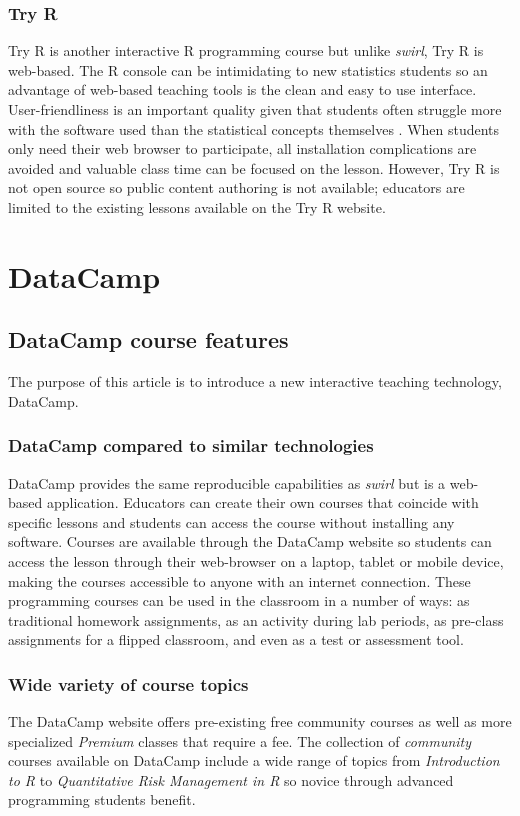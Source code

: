 \documentclass[12pt]{article}\usepackage[]{graphicx}\usepackage[]{color}
\begin{document}
\subsubsection{Try R}
Try R \citep{TryR} is another interactive R programming course but unlike \textit{swirl}, Try R is web-based. 
The R console can be intimidating to
new statistics students so an advantage of web-based teaching tools is
the clean and easy to use interface. User-friendliness is an important quality given that students often struggle more with the
software used than the statistical concepts themselves \citep{Hare2017}. When students only need their web browser to participate,
all installation complications are avoided and valuable class time can be focused on the lesson.
However, Try R is not open source so public content authoring
is not available; educators are limited to the existing lessons available on the Try R website. 

\section{DataCamp}


\subsection{DataCamp course features}

The purpose of this article is to introduce a new interactive teaching technology, DataCamp.

\subsubsection{DataCamp compared to similar technologies}
DataCamp provides the same reproducible capabilities as \textit{swirl} but is a web-based application. Educators can
create their own courses that coincide with specific lessons and students can access the course without installing any software.
Courses are available through the DataCamp website so students can access the lesson through their web-browser on a laptop,
tablet or mobile device, making the courses accessible to anyone with an internet connection. These programming courses can be used in the 
classroom in a number of ways: as traditional homework assignments, as an activity during lab periods, as pre-class assignments
for a flipped classroom, and even as a test or assessment tool.

\subsubsection{Wide variety of course topics}
The DataCamp website offers pre-existing free community courses as well as more specialized \textit{Premium} classes that require a fee. 
The collection of \textit{community} courses available on DataCamp include a wide range of topics from \textit{Introduction to R} to
\textit{Quantitative Risk Management in R} so novice through advanced programming students benefit.
\end{document}
